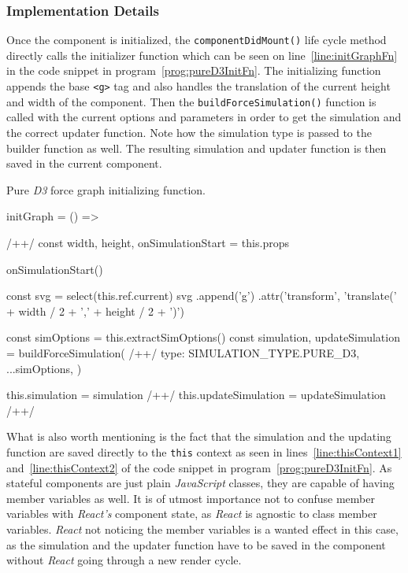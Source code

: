 \subsubsection{Implementation Details}

Once the component is initialized, the \texttt{componentDidMount()} life cycle method directly calls the initializer function which can be seen on line~\ref{line:initGraphFn} in the code snippet in program~\ref{prog:pureD3InitFn}. The initializing function appends the base \texttt{<g>} tag and also handles the translation of the current height and width of the component. Then the \texttt{buildForceSimulation()} function is called with the current options and parameters in order to get the simulation and the correct updater function. Note how the simulation type is passed to the builder function as well. The resulting simulation and updater function is then saved in the current component.

\begin{program}
\caption{Pure \emph{D3} force graph initializing function.}
\label{prog:pureD3InitFn}
\begin{JsCode}
initGraph = () => { /+\label{line:initGraphFn}+/
  const { width, height, onSimulationStart } = this.props

  onSimulationStart()

  const svg = select(this.ref.current)
  svg
    .append('g')
    .attr('transform', 'translate(' + width / 2 + ',' + height / 2 + ')')

  const simOptions = this.extractSimOptions()
  const { simulation, updateSimulation } = buildForceSimulation({ /+\label{line:buildForceSimulation}+/
    type: SIMULATION_TYPE.PURE_D3,
    ...simOptions,
  })

  this.simulation = simulation /+\label{line:thisContext1}+/
  this.updateSimulation = updateSimulation /+\label{line:thisContext2}+/
}
\end{JsCode}
\end{program}

What is also worth mentioning is the fact that the simulation and the updating function are saved directly to the \texttt{this} context as seen in lines~\ref{line:thisContext1} and~\ref{line:thisContext2} of the code snippet in program~\ref{prog:pureD3InitFn}. As stateful components are just plain \emph{JavaScript} classes, they are capable of having member variables as well. It is of utmost importance not to confuse member variables with \emph{React's} component state, as \emph{React} is agnostic to class member variables. \emph{React} not noticing the member variables is a wanted effect in this case, as the simulation and the updater function have to be saved in the component without \emph{React} going through a new render cycle. 

